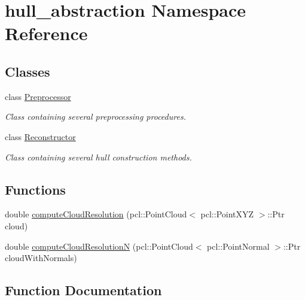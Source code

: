 \hypertarget{namespacehull__abstraction}{}\section{hull\+\_\+abstraction Namespace Reference}
\label{namespacehull__abstraction}
\subsection*{Classes}
\begin{DoxyCompactItemize}
\item 
class \hyperlink{classhull__abstraction_1_1_preprocessor}{Preprocessor}
\begin{DoxyCompactList}\small\item\em Class containing several preprocessing procedures. \end{DoxyCompactList}\item 
class \hyperlink{classhull__abstraction_1_1_reconstructor}{Reconstructor}
\begin{DoxyCompactList}\small\item\em Class containing several hull construction methods. \end{DoxyCompactList}\end{DoxyCompactItemize}
\subsection*{Functions}
\begin{DoxyCompactItemize}
\item 
double \hyperlink{namespacehull__abstraction_aee513dfed72060d83ec57c5909c9640e}{compute\+Cloud\+Resolution} (pcl\+::\+Point\+Cloud$<$ pcl\+::\+Point\+X\+YZ $>$\+::Ptr cloud)
\item 
double \hyperlink{namespacehull__abstraction_af42d720ef8e6155d54b04ad4c7982ad5}{compute\+Cloud\+ResolutionN} (pcl\+::\+Point\+Cloud$<$ pcl\+::\+Point\+Normal $>$\+::Ptr cloud\+With\+Normals)
\end{DoxyCompactItemize}


\subsection{Function Documentation}

